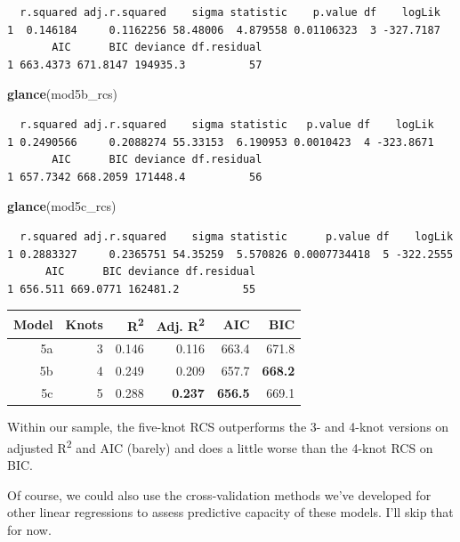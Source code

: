\documentclass[]{book}
\newenvironment{Shaded}{\begin{snugshade}}{\end{snugshade}}
\newcommand{\KeywordTok}[1]{\textcolor[rgb]{0.13,0.29,0.53}{\textbf{#1}}}
\newcommand{\NormalTok}[1]{#1}
\theoremstyle{definition}
\theoremstyle{definition}
\theoremstyle{definition}
\theoremstyle{remark}
\begin{document}
\begin{verbatim}
  r.squared adj.r.squared    sigma statistic    p.value df    logLik
1  0.146184     0.1162256 58.48006  4.879558 0.01106323  3 -327.7187
       AIC      BIC deviance df.residual
1 663.4373 671.8147 194935.3          57
\end{verbatim}

\begin{Shaded}
\begin{Highlighting}[]
\KeywordTok{glance}\NormalTok{(mod5b_rcs)}
\end{Highlighting}
\end{Shaded}

\begin{verbatim}
  r.squared adj.r.squared    sigma statistic   p.value df    logLik
1 0.2490566     0.2088274 55.33153  6.190953 0.0010423  4 -323.8671
       AIC      BIC deviance df.residual
1 657.7342 668.2059 171448.4          56
\end{verbatim}

\begin{Shaded}
\begin{Highlighting}[]
\KeywordTok{glance}\NormalTok{(mod5c_rcs)}
\end{Highlighting}
\end{Shaded}

\begin{verbatim}
  r.squared adj.r.squared    sigma statistic      p.value df    logLik
1 0.2883327     0.2365751 54.35259  5.570826 0.0007734418  5 -322.2555
      AIC      BIC deviance df.residual
1 656.511 669.0771 162481.2          55
\end{verbatim}

\begin{longtable}[]{@{}rrrrrr@{}}
\toprule
Model & Knots & R\textsuperscript{2} & Adj. R\textsuperscript{2} & AIC &
BIC\tabularnewline
\midrule
\endhead
5a & 3 & 0.146 & 0.116 & 663.4 & 671.8\tabularnewline
5b & 4 & 0.249 & 0.209 & 657.7 & \textbf{668.2}\tabularnewline
5c & 5 & 0.288 & \textbf{0.237} & \textbf{656.5} & 669.1\tabularnewline
\bottomrule
\end{longtable}

Within our sample, the five-knot RCS outperforms the 3- and 4-knot
versions on adjusted R\textsuperscript{2} and AIC (barely) and does a
little worse than the 4-knot RCS on BIC.

Of course, we could also use the cross-validation methods we've
developed for other linear regressions to assess predictive capacity of
these models. I'll skip that for now.
\end{document}
